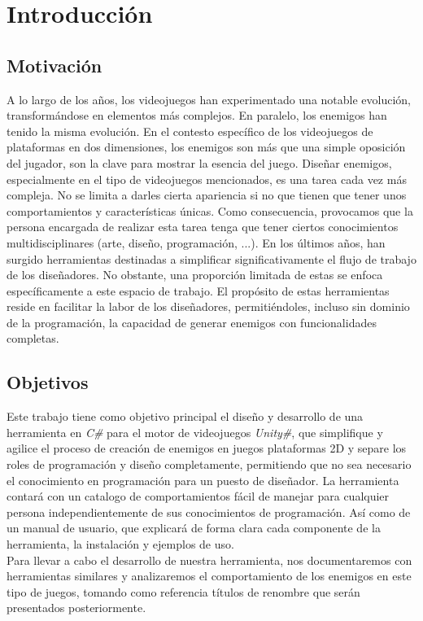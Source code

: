 \chapter{Introducción}
\label{cap:introduccion}


\section{Motivación}
A lo largo de los años, los videojuegos han experimentado una notable evolución, transformándose en elementos más complejos. En paralelo, los enemigos han tenido la misma evolución. En el contesto específico de los videojuegos de plataformas en dos dimensiones, los enemigos son más que una simple oposición del jugador, son la clave para mostrar la esencia del juego. Diseñar enemigos, especialmente en el tipo de videojuegos mencionados, es una tarea cada vez más compleja. No se limita a darles cierta apariencia si no que tienen que tener unos comportamientos y características únicas.  Como consecuencia, provocamos que la persona encargada de realizar esta tarea tenga que tener ciertos conocimientos multidisciplinares (arte, diseño, programación, ...). 
En los últimos años, han surgido herramientas destinadas a simplificar significativamente el flujo de trabajo de los diseñadores. No obstante, una proporción limitada de estas se enfoca específicamente a este espacio de trabajo. El propósito de estas herramientas reside en facilitar la labor de los diseñadores, permitiéndoles, incluso sin dominio de la programación, la capacidad de generar enemigos con funcionalidades completas.

\section{Objetivos}
Este trabajo tiene como objetivo principal el diseño y desarrollo de una herramienta en  \textit{C\#} para el motor de videojuegos \textit{Unity\#}, que simplifique y agilice el proceso de creación de enemigos en juegos plataformas 2D y separe los roles de programación y diseño completamente, permitiendo que no sea necesario el conocimiento en programación para un puesto de diseñador.
La herramienta contará con un catalogo de comportamientos fácil de manejar para cualquier persona independientemente de sus conocimientos de programación. Así como de un manual de usuario, que explicará de forma clara cada componente de la herramienta, la instalación y ejemplos de uso. \\
Para llevar a cabo el desarrollo de nuestra herramienta, nos documentaremos con herramientas similares y analizaremos el comportamiento de los enemigos en este tipo de juegos, tomando como referencia títulos de renombre que serán presentados posteriormente.



